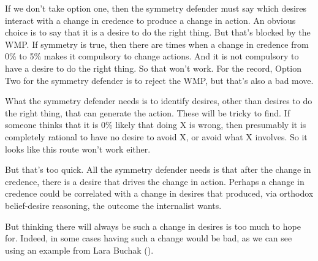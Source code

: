 \documentclass[
  10pt,
  letterpaper,
  twoside]{scrbook}
\begin{document}
If we don't take option one, then the symmetry defender must say which
desires interact with a change in credence to produce a change in
action. An obvious choice is to say that it is a desire to do the right
thing. But that's blocked by the WMP. If symmetry is true, then there
are times when a change in credence from 0\% to 5\% makes it compulsory
to change actions. And it is not compulsory to have a desire to do the
right thing. So that won't work. For the record, Option Two for the
symmetry defender is to reject the WMP, but that's also a bad move.

What the symmetry defender needs is to identify desires, other than
desires to do the right thing, that can generate the action. These will
be tricky to find. If someone thinks that it is 0\% likely that doing X
is wrong, then presumably it is completely rational to have no desire to
avoid X, or avoid what X involves. So it looks like this route won't
work either.

But that's too quick. All the symmetry defender needs is that after the
change in credence, there is a desire that drives the change in action.
Perhaps a change in credence could be correlated with a change in
desires that produced, via orthodox belief-desire reasoning, the outcome
the internalist wants.

But thinking there will always be such a change in desires is too much
to hope for. Indeed, in some cases having such a change would be bad, as
we can see using an example from Lara Buchak
().
\end{document}
